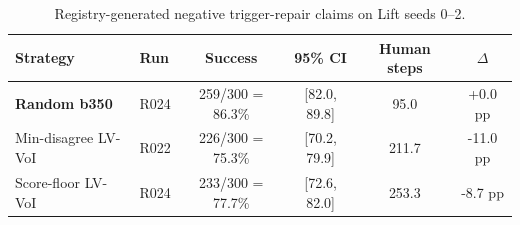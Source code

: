\begin{table}[t]
\centering
\caption{Registry-generated negative trigger-repair claims on Lift seeds 0--2.}
\label{tab:registry_trigger_repairs}
\begin{tabular}{llcccc}
\toprule
Strategy & Run & Success & 95\% CI & Human steps & $\Delta$ \\
\midrule
\textbf{Random b350} & R024 & 259/300 = 86.3\% & [82.0, 89.8] & 95.0 & +0.0 pp \\
Min-disagree LV-VoI & R022 & 226/300 = 75.3\% & [70.2, 79.9] & 211.7 & -11.0 pp \\
Score-floor LV-VoI & R024 & 233/300 = 77.7\% & [72.6, 82.0] & 253.3 & -8.7 pp \\
\bottomrule
\end{tabular}
\end{table}
